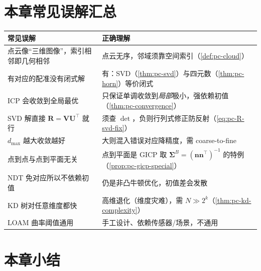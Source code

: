 \section*{本章常见误解汇总}
\begin{table}[H]\centering\small
\begin{tabular}{p{} p{}}
\toprule
\textbf{常见误解} & \textbf{正确理解} \\
\midrule
点云像“三维图像”，索引相邻即几何相邻 & 点云无序，邻域须靠空间索引（\cref{def:pc-cloud}）\\
有对应的配准没有闭式解 & 有：SVD（\cref{thm:pc-svd}）与四元数（\cref{thm:pc-horn}）等价闭式 \\
ICP 会收敛到全局最优 & 只保证单调收敛到\emph{局部}极小，强依赖初值（\cref{thm:pc-convergence}）\\
SVD 解直接 $\mathbf{R}=\mathbf{V}\mathbf{U}^\top$ 就行 & 须查 $\det$，负则行列式修正防反射（\cref{eq:pc-R-svd-fix}）\\
$d_{\max}$ 越大收敛越好 & 大则混入错误对应降精度，需 coarse-to-fine \\
点到点与点到平面无关 & 点到平面是 GICP 取 $\boldsymbol{\Sigma}^B=(\mathbf{n}\mathbf{n}^\top)^{-1}$ 的特例（\cref{prop:pc-gicp-special}）\\
NDT 免对应所以不依赖初值 & 仍是非凸牛顿优化，初值差会发散 \\
KD 树对任意维度都快 & 高维退化（维度灾难），需 $N\gg2^k$（\cref{thm:pc-kd-complexity}）\\
LOAM 曲率阈值通用 & 手工设计、依赖传感器/场景，不通用 \\
\bottomrule
\end{tabular}
\end{table}

\section*{本章小结}

